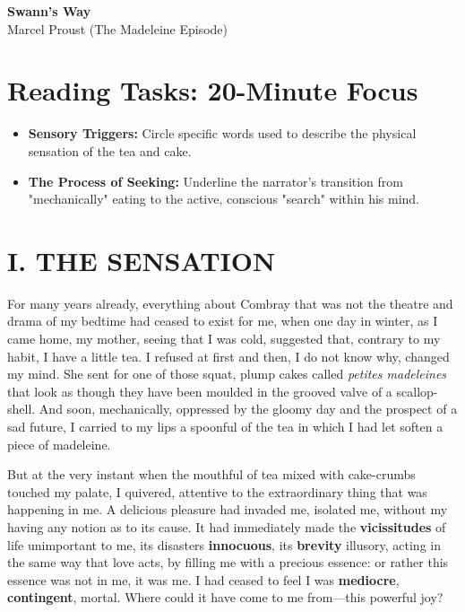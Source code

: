 \documentclass[11pt, a4paper]{article}
\begin{document}
\begin{flushleft}
    \vspace*{-1cm}
    {\Huge \textbf{Swann's Way }} \\ 
    \vspace{0.2em}
    {\large Marcel Proust (The Madeleine Episode) }\\ 
    
\end{flushleft}

\vspace{1em}
\section*{Reading Tasks: 20-Minute Focus}
\vspace{-0.5em}

\begin{itemize}[leftmargin=1.5em, itemsep=0.5em]
    \item \textbf{Sensory Triggers:} Circle specific words used to describe the physical sensation of the tea and cake.
    \item \textbf{The Process of Seeking:} Underline the narrator's transition from "mechanically" eating to the active, conscious "search" within his mind.
\end{itemize}
\vspace{0em}

\linenumbers 

\section*{I. THE SENSATION}

For many years already, everything about Combray that was not the theatre and drama of my bedtime had ceased to exist for me, when one day in winter, as I came home, my mother, seeing that I was cold, suggested that, contrary to my habit, I have a little tea. I refused at first and then, I do not know why, changed my mind. She sent for one of those squat, plump cakes called \textit{petites madeleines} that look as though they have been moulded in the grooved valve of a scallop-shell. And soon, mechanically, oppressed by the gloomy day and the prospect of a sad future, I carried to my lips a spoonful of the tea in which I had let soften a piece of madeleine.

But at the very instant when the mouthful of tea mixed with cake-crumbs touched my palate, I quivered, attentive to the extraordinary thing that was happening in me. A delicious pleasure had invaded me, isolated me, without my having any notion as to its cause. It had immediately made the \textbf{vicissitudes} of life unimportant to me, its disasters \textbf{innocuous}, its \textbf{brevity} illusory, acting in the same way that love acts, by filling me with a precious essence: or rather this essence was not in me, it was me. I had ceased to feel I was \textbf{mediocre}, \textbf{contingent}, mortal. Where could it have come to me from—this powerful joy?
\end{document}
